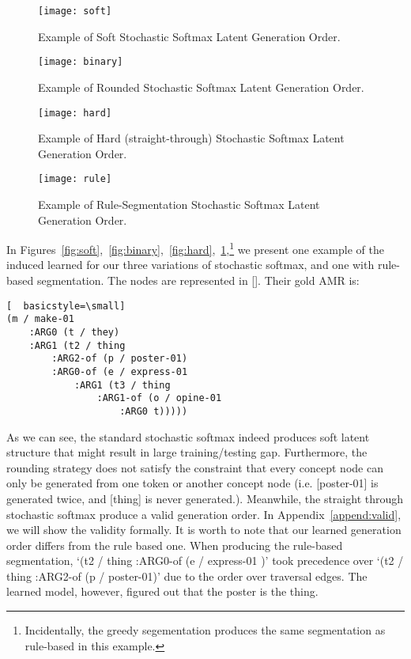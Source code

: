 \documentclass[11pt]{article}
\begin{document}
\begin{figure}
    \centering  
    \texttt{[image: soft]} 
    \caption{Example of Soft Stochastic Softmax Latent Generation Order.} \label{fig:soft}
    \centering
    \texttt{[image: binary]} 
    \caption{Example of Rounded Stochastic Softmax Latent Generation Order.} \label{fig:binary}
    \centering
    \texttt{[image: hard]} 
    \caption{Example of Hard (straight-through) Stochastic Softmax Latent Generation Order.} \label{fig:hard}
    \centering
    \texttt{[image: rule]}
    \caption{Example of Rule-Segmentation Stochastic Softmax Latent Generation Order.}  \label{fig:rule}
\end{figure}
In Figures~\ref{fig:soft},~\ref{fig:binary},~\ref{fig:hard},~\ref{fig:rule},\footnote{Incidentally, the greedy segementation produces the same segmentation as rule-based in this example.} we present one example of the induced learned for our three variations of stochastic softmax, and one with rule-based segmentation. The nodes are represented in []. Their gold AMR is:
\begin{lstlisting}[  basicstyle=\small]
(m / make-01
    :ARG0 (t / they)
    :ARG1 (t2 / thing
        :ARG2-of (p / poster-01)
        :ARG0-of (e / express-01
            :ARG1 (t3 / thing
                :ARG1-of (o / opine-01
                    :ARG0 t)))))
\end{lstlisting}
As we can see, the standard stochastic softmax indeed produces soft latent structure that might result in large training/testing gap. Furthermore, the rounding strategy does not satisfy the constraint that every concept node can only be generated from one token or another concept node (i.e. [poster-01] is generated twice, and [thing] is never generated.). Meanwhile, the straight through stochastic softmax produce a valid generation order. In Appendix~\ref{append:valid}, we will show the validity formally. It is worth to note that our learned generation order differs from the rule based one. When producing the rule-based segmentation, `(t2 / thing  :ARG0-of (e / express-01 )' took precedence over `(t2 / thing  :ARG2-of (p / poster-01)' due to the order over traversal edges. The learned model, however, figured out that the poster is the thing. 
\end{document}
